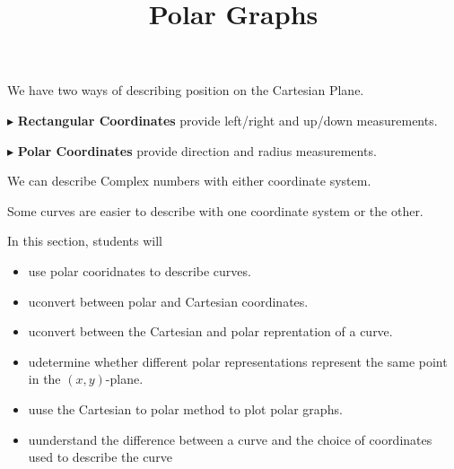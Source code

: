 \documentclass{ximera}
\title{Polar Graphs}
\begin{document}
\begin{abstract}
\end{abstract}
\maketitle





We have two ways of describing position on the Cartesian Plane.


$\blacktriangleright$ \textbf{Rectangular Coordinates} provide left/right and up/down measurements.





$\blacktriangleright$ \textbf{Polar Coordinates} provide direction and radius measurements.




We can describe Complex numbers with either coordinate system.


Some curves are easier to describe with one coordinate system or the other.




\begin{sectionOutcomes}
In this section, students will 

\begin{itemize}
\item use polar cooridnates to describe curves.
\item uconvert between polar and Cartesian coordinates.
\item uconvert between the Cartesian and polar reprentation of a curve.
\item udetermine whether different polar representations represent the same point in the $(x,y)$-plane.
\item uuse the Cartesian to polar method to plot polar graphs.
\item uunderstand the difference between a curve and the choice of coordinates used to describe the curve
\end{itemize}
\end{sectionOutcomes}
\end{document}
